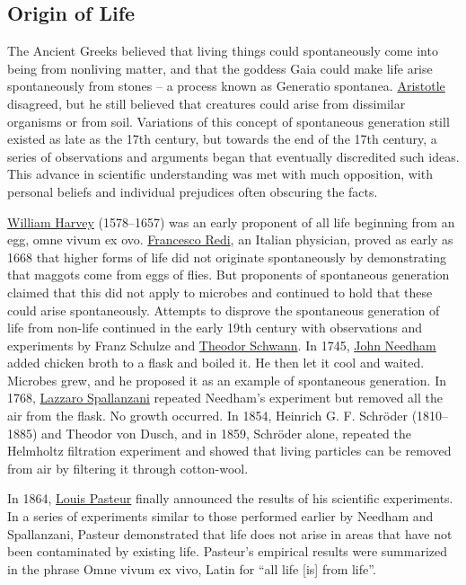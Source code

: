 \documentclass[
]{article}
\begin{document}
\hypertarget{origin-of-life}{%
\subsection{Origin of Life}\label{origin-of-life}}

The Ancient Greeks believed that living things could spontaneously come
into being from nonliving matter, and that the goddess Gaia could make
life arise spontaneously from stones -- a process known as Generatio
spontanea. \href{https://en.wikipedia.org/wiki/Aristotle}{Aristotle}
disagreed, but he still believed that creatures could arise from
dissimilar organisms or from soil. Variations of this concept of
spontaneous generation still existed as late as the 17th century, but
towards the end of the 17th century, a series of observations and
arguments began that eventually discredited such ideas. This advance in
scientific understanding was met with much opposition, with personal
beliefs and individual prejudices often obscuring the facts.

\href{https://en.wikipedia.org/wiki/William_Harvey}{William Harvey}
(1578--1657) was an early proponent of all life beginning from an egg,
omne vivum ex ovo.
\href{https://en.wikipedia.org/wiki/Francesco_Redi}{Francesco Redi}, an
Italian physician, proved as early as 1668 that higher forms of life did
not originate spontaneously by demonstrating that maggots come from eggs
of flies. But proponents of spontaneous generation claimed that this did
not apply to microbes and continued to hold that these could arise
spontaneously. Attempts to disprove the spontaneous generation of life
from non-life continued in the early 19th century with observations and
experiments by Franz Schulze and
\href{https://en.wikipedia.org/wiki/Theodor_Schwann}{Theodor Schwann}.
In 1745, \href{https://en.wikipedia.org/wiki/John_Needham}{John Needham}
added chicken broth to a flask and boiled it. He then let it cool and
waited. Microbes grew, and he proposed it as an example of spontaneous
generation. In 1768,
\href{https://en.wikipedia.org/wiki/Lazzaro_Spallanzani}{Lazzaro
Spallanzani} repeated Needham's experiment but removed all the air from
the flask. No growth occurred. In 1854, Heinrich G. F. Schröder
(1810--1885) and Theodor von Dusch, and in 1859, Schröder alone,
repeated the Helmholtz filtration experiment and showed that living
particles can be removed from air by filtering it through cotton-wool.

In 1864, \href{https://en.wikipedia.org/wiki/Louis_Pasteur}{Louis
Pasteur} finally announced the results of his scientific experiments. In
a series of experiments similar to those performed earlier by Needham
and Spallanzani, Pasteur demonstrated that life does not arise in areas
that have not been contaminated by existing life. Pasteur's empirical
results were summarized in the phrase Omne vivum ex vivo, Latin for
``all life {[}is{]} from life''.
\end{document}
